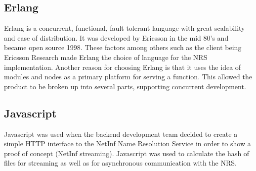 \subsection{Erlang}
Erlang is a concurrent, functional, fault-tolerant language with great scalability and ease of distribution. It was developed by Ericsson in the mid 80's and became open source 1998.\cite{otpInAction} These factors among others such as the client being Ericsson Research made Erlang the choice of language for the NRS implementation.
Another reason for choosing Erlang is that it uses the idea of modules and nodes as a primary platform for serving a function. This allowed the product to be broken up into several parts, supporting concurrent development.
\subsection{Javascript}
Javascript \cite{javascript} was used when the backend development team decided to create a simple HTTP interface to the NetInf Name Resolution Service in order to show a proof of concept (NetInf streaming). Javascript was used to calculate the hash of files for streaming as well as for asynchronous communication with the NRS.
